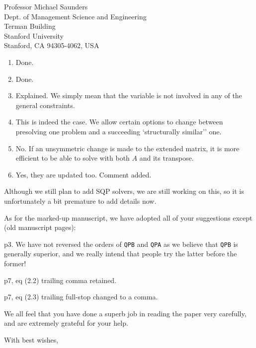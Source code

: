 \documentclass[12pt,a4paper]{letter}
\begin{document}
\begin{letter}{Professor Michael Saunders \\
Dept. of Management Science and Engineering \\
Terman Building \\
Stanford University \\
Stanford, CA 94305-4062, USA}
\begin{enumerate}
\item Done.

\item Done.

\item Explained. We simply mean that the variable is not involved in
any of the general constraints.

\item This is indeed the case. We allow certain options to change
between presolving one problem and a succeeding `structurally similar'' one.

\item No. If an unsymmetric change is made to the extended matrix, it
is more efficient to be able to solve with both $A$ and its transpose.

\item Yes, they are updated too. Comment added.
\end{enumerate}
Although we still plan to add SQP solvers, we are still working on this,
so it is unfortunately a bit premature to add details now.

As for the marked-up manuscript, we have adopted all of your suggestions
except (old manuscript pages):

\begin{description}
\item p3. We have not reversed the orders of
{\tt QPB} and {\tt QPA} as we believe that
{\tt QPB} is generally superior, and we really intend that
people try the latter before the former!

\item p7, eq (2.2) trailing comma retained.

\item p7, eq (2.3) trailing full-stop changed to a comma.
\end{description}

We all feel that you have done a superb job in reading the
paper very carefully, and are extremely grateful for your help.

\closing{With best wishes,}

\end{letter}
\end{document}

